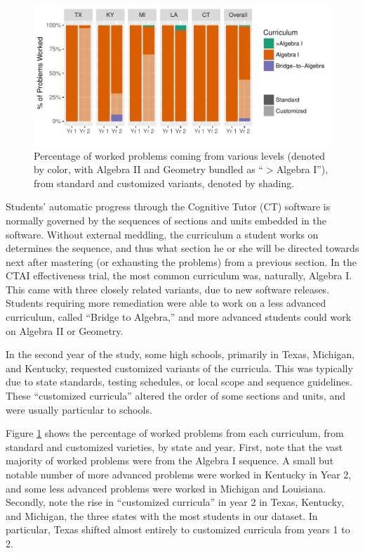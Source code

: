 \documentclass[12pt]{article}\usepackage[]{graphicx}\usepackage[]{color}
\makeatletter
\def\maxwidth{ %
  \ifdim\Gin@nat@width>\linewidth
    \linewidth
  \else
    \Gin@nat@width
  \fi
}
\makeatother
\begin{document}
\begin{figure}
  \centering

\includegraphics[width=\maxwidth]{figure/curricula-1} 

\caption{Percentage of worked problems coming from various levels
  (denoted by color, with Algebra II and Geometry bundled as ``$>$Algebra I''), from
  standard and customized variants, denoted by shading.}
\label{fig:curricula}
\end{figure}

Students' automatic progress through the Cognitive Tutor (CT) software
is normally governed by
the sequences of sections and units embedded in the software.
Without external meddling, the curriculum a student works on
determines the sequence, and thus what section he or she will be directed towards next after
mastering (or exhausting the problems) from a previous section.
In the CTAI effectiveness trial, the most common curriculum was,
naturally, Algebra I.
This came with three closely related variants, due to new software releases.
Students requiring more remediation were able to work on a less
advanced curriculum, called ``Bridge to Algebra,'' and more advanced
students could work on Algebra II or Geometry.

In the second year of the study, some high schools, primarily in
Texas, Michigan, and Kentucky, requested customized variants of the
curricula.
This was typically due to state standards, testing schedules, or local
scope and sequence guidelines.
These ``customized curricula'' altered the order of some sections and
units, and were usually particular to schools.

Figure \ref{fig:curricula} shows the percentage of worked problems
from each curriculum, from standard and customized varieties, by state
and year.
First, note that the vast majority of worked problems were from the
Algebra I sequence.
A small but notable number of more advanced problems were worked in
Kentucky in Year 2, and some less advanced problems were worked in
Michigan and Louisiana.
Secondly, note the rise in ``customized curricula'' in year 2 in
Texas, Kentucky, and Michigan, the three states with the most students
in our dataset.
In particular, Texas shifted almost entirely to customized curricula
from years 1 to 2.
\end{document}
